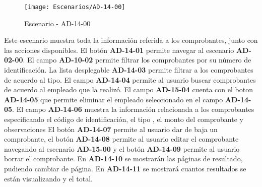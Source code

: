 \begin{figure}[H]
\centering
\texttt{[image: Escenarios/AD-14-00]}
\caption{Escenario - AD-14-00}
\label{fig:AD-14-00}
\end{figure}
Este escenario muestra toda la información referida a los comprobantes, junto con las acciones disponibles.
El botón \textbf{AD-14-01} permite navegar al escenario \textbf{AD-02-00}. El campo \textbf{AD-10-02} permite filtrar los comprobantes por su número de identificación. La lista desplegable \textbf{AD-14-03} permite filtrar a los comprobantes de acuerdo al tipo. El campo \textbf{AD-14-04} permite al usuario buscar comprobantes de acuerdo al empleado que la realizó. El campo \textbf{AD-15-04} cuenta con el boton \textbf{AD-14-05} que permite eliminar el empleado seleccionado en el campo \textbf{AD-14-05}.
El campo \textbf{AD-14-06} muestra la información relacionada a los comprobantes especificando el código de identificación, el tipo , el monto del comprobante y observaciones El botón \textbf{AD-14-07} permite al usuario dar de baja un comprobante, el botón \textbf{AD-14-08} permite al usuario editar el comprobante navegando al escenario \textbf{AD-15-00} y el botón \textbf{AD-14-09} permite al usuario borrar el comprobante. 
En  \textbf{AD-14-10} se mostrarán las páginas de resultado, pudiendo cambiar de página. En \textbf{AD-14-11} se mostrará cuantos resultados se están visualizando y el total.
\clearpage
